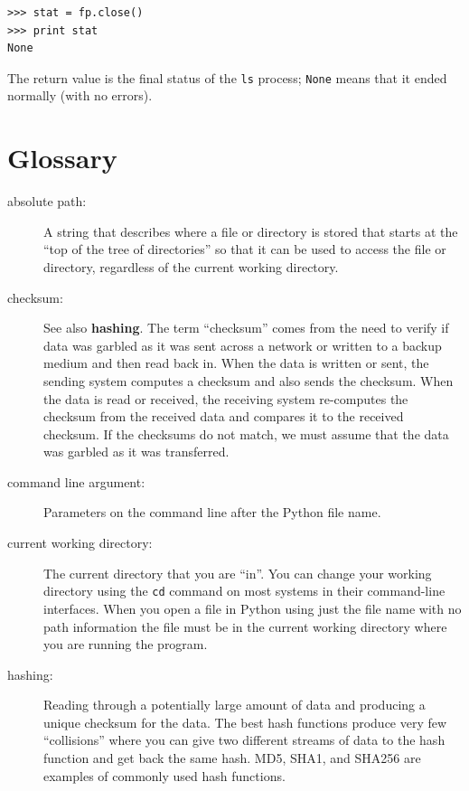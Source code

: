 \documentclass[11pt]{book}
\begin{document}

\beforeverb
\begin{verbatim}
>>> stat = fp.close()
>>> print stat
None
\end{verbatim}
\afterverb
%
The return value is the final status of the {\tt ls} process;
{\tt None} means that it ended normally (with no errors).

\section{Glossary}

\begin{description}

\item[absolute path:] A string that describes where a file or
directory is stored that starts at the ``top of the tree of directories''
so that it can be used to access the file or directory, regardless
of the current working directory.

\item[checksum:] See also {\bf hashing}.  The term ``checksum'' 
comes from the need to verify if data was garbled as it was 
sent across a network or written to a backup medium and then
read back in.  When the data is written or sent, the sending system
computes a checksum and also sends the checksum.  When the 
data is read or received, the receiving system re-computes
the checksum from the received data and compares it to the 
received checksum.  If the checksums do not match, we must
assume that the data was garbled as it was transferred.

\item[command line argument:] Parameters on the command line after the Python file name.


\item[current working directory:] The current directory that you 
are ``in''.  You can change your working directory using the 
{\tt cd} command on most systems in their command-line interfaces.
When you open a file in Python using just the file name with no path 
information the file must be in the current working directory
where you are running the program.

\item[hashing:] Reading through a potentially large amount of data
and producing a unique checksum for the data.  The best hash functions
produce very few ``collisions'' where you can give two different
streams of data to the hash function and get back the same hash. 
MD5, SHA1, and SHA256 are examples of commonly used hash functions.


\end{description}
\end{document}
